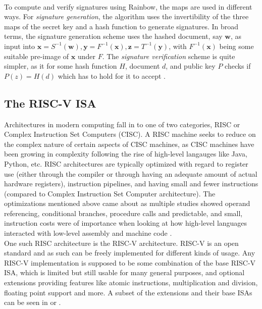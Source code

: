 \medskip\\
To compute and verify signatures using Rainbow, the maps are used in different ways.
For \textit{signature generation}, the algorithm uses the invertibility of the three maps of the secret key and a hash function to generate signatures. In broad terms, the signature generation scheme uses the hashed document, say $\mathbf{w}$, as input into $\mathbf{x} = S^{-1}(\mathbf{w}), \mathbf{y} = F^{-1}(\mathbf{x}), \mathbf{z} = T^{-1}(\mathbf{y})$, with $F^{-1}(\mathbf{x})$ being some suitable pre-image of $\mathbf{x}$ under $F$. The \textit{signature verification} scheme is quite simpler, as it for some hash function $H$, document $d$, and public key $P$ checks if $P(z) = H(d)$ which has to hold for it to accept \cite{multicrypto}.

\subsection{The RISC-V ISA} \label{pre-riscv}
Architectures in modern computing fall in to one of two categories, RISC or Complex Instruction Set Computers (CISC). A RISC machine seeks to reduce on the complex nature of certain aspects of CISC machines, as CISC machines have been growing in complexity following the rise of high-level langauges like Java, Python, etc. RISC architectures are typically optimized with regard to register use (either through the compiler or through having an adequate amount of actual hardware registers), instruction pipelines, and having small and fewer instructions (compared to Complex Instruction Set Computer architecture). The optimizations mentioned above came about as multiple studies showed operand referencing, conditional branches, procedure calls and predictable, and small, instruction costs were of importance when looking at how high-level languages interacted with low-level assembly and machine code \cite{stallings}.
\medskip\\
One such RISC architecture is the RISC-V architecture. RISC-V is an open standard and as such can be freely implemented for different kinds of usage. Any RISC-V implementation is supposed to be some combination of the base RISC-V ISA, which is limited but still usable for many general purposes, and optional extensions providing features like atomic instructions, multiplication and division, floating point support and more. A subset of the extensions and their base ISAs can be seen in \cite{riscvmodular} or \cite{riscdesign}.
\medskip\\
